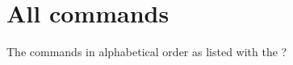 \documentclass[12pt]{article}
\begin{document}
%
%

\section{All commands}

The commands in alphabetical order as listed with the ?
\end{document}
